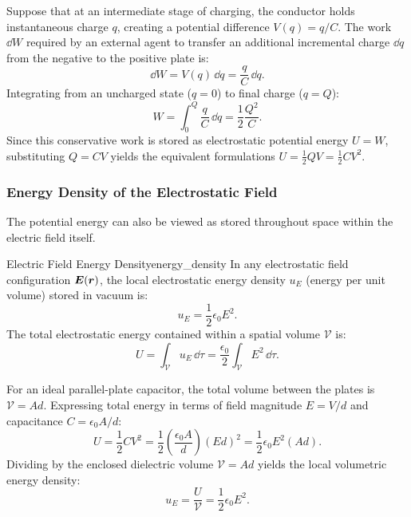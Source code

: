 \begin{proofbox}
    Suppose that at an intermediate stage of charging, the conductor holds instantaneous charge \(q\), creating a potential difference \(V(q) = q/C\). The work \(\dd W\) required by an external agent to transfer an additional incremental charge \(\dd q\) from the negative to the positive plate is:
    \begin{equation}
        \dd W = V(q)\,\dd q = \frac{q}{C}\,\dd q.
    \end{equation}
    Integrating from an uncharged state (\(q = 0\)) to final charge (\(q = Q\)):
    \begin{equation}
        W = \int_0^Q \frac{q}{C}\,\dd q = \frac{1}{2}\frac{Q^2}{C}.
    \end{equation}
    Since this conservative work is stored as electrostatic potential energy \(U = W\), substituting \(Q = CV\) yields the equivalent formulations \(U = \frac{1}{2}QV = \frac{1}{2}CV^2\).
\end{proofbox}

\subsubsection{Energy Density of the Electrostatic Field}

The potential energy can also be viewed as stored throughout space within the electric field itself.

\begin{theorem}{Electric Field Energy Density}{energy_density}
    In any electrostatic field configuration \(\bm{E}(\bm{r})\), the local electrostatic energy density \(u_E\) (energy per unit volume) stored in vacuum is:
    \begin{equation}
        u_E = \frac{1}{2}\epsilon_0 E^2.
    \end{equation}
    The total electrostatic energy contained within a spatial volume \(\mathcal{V}\) is:
    \begin{equation}
        U = \int_{\mathcal{V}} u_E\,\dd\tau = \frac{\epsilon_0}{2}\int_{\mathcal{V}} E^2\,\dd\tau.
    \end{equation}
\end{theorem}

\begin{proofbox}
    For an ideal parallel-plate capacitor, the total volume between the plates is \(\mathcal{V} = A d\). Expressing total energy in terms of field magnitude \(E = V/d\) and capacitance \(C = \epsilon_0 A/d\):
    \begin{equation}
        U = \frac{1}{2}CV^2 = \frac{1}{2}\left(\frac{\epsilon_0 A}{d}\right)(Ed)^2 = \frac{1}{2}\epsilon_0 E^2(Ad).
    \end{equation}
    Dividing by the enclosed dielectric volume \(\mathcal{V} = Ad\) yields the local volumetric energy density:
    \begin{equation}
        u_E = \frac{U}{\mathcal{V}} = \frac{1}{2}\epsilon_0 E^2.
    \end{equation}
\end{proofbox}

